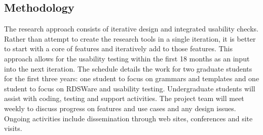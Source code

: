 \subsection{Methodology}
The research approach consists of iterative design and integrated usability checks.  Rather than attempt to create the research tools in a single iteration, it is better to start with a core of features and iteratively add to those features. This approach allows for the usability testing within the first 18 months as an input into the next iteration.  The schedule details the work for two graduate students for the first three years: one student to focus on grammars and templates and one student to focus on RDSWare and usability testing.  Undergraduate students will assist with coding, testing and support activities.  The project team will meet weekly to discuss progress on features and use cases and any design issues.  Ongoing activities include dissemination through web sites, conferences and site visits.  